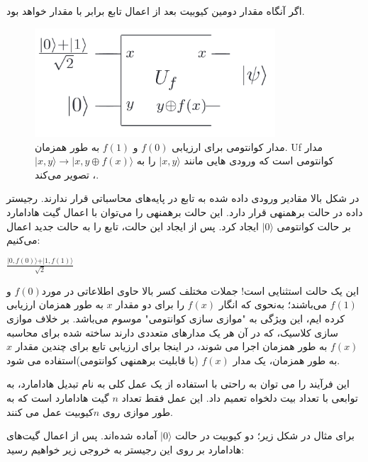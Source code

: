 \documentclass{book}
\begin{document}
اگر  آنگاه مقدار دومین کیوبیت بعد از اعمال تابع  برابر با مقدار  خواهد بود.

 \begin{center}
 	 \begin{figure}[ht]
 		\centering
 		\includegraphics[width=0.8\textwidth]{Uforacle.png}
 		\caption{مدار کوانتومی برای ارزیابی $f (0)$ و $f (1)$ به طور همزمان. Uf مدار کوانتومی است که ورودی هایی مانند $\vert x, y\rangle$ را به $\vert x, y \rangle \rightarrow \vert x, y \oplus f(x) \rangle$، تصویر می‌کند.}
 	\end{figure}
 \end{center}

در شکل بالا مقادیر ورودی داده شده به تابع  در پایه‌های محاسباتی قرار ندارند. رجیستر داده در حالت برهمنهی  قرار دارد. این حالت برهمنهی را می‌توان با اعمال گیت هادامارد بر حالت کوانتومی $\vert 0 \rangle$ ایجاد کرد. پس از ایجاد این حالت، تابع  را به حالت جدید اعمال می‌کنیم:
\begin{center}
	$\frac{\vert 0,f(0) \rangle +\vert 1,f(1) \rangle }{\sqrt{2}}$
\end{center}

این یک حالت استثنایی است! جملات مختلف کسر بالا حاوی اطلاعاتی در مورد$ f (0)$ و$f (1)$ می‌باشند؛ به‌نحوی که انگار $f (x)$ را برای دو مقدار $x$ به طور همزمان ارزیابی کرده ایم، این ویژگی به "موازی  سازی کوانتومی" موسوم می‌باشد. بر خلاف موازی سازی کلاسیک، که در آن هر یک مدارهای متعددی دارند ساخته شده برای محاسبه $f (x)$ به طور همزمان اجرا می شوند، در اینجا برای ارزیابی تابع برای چندین مقدار $x$ به طور همزمان، یک مدار $f (x)$ (با قابلیت برهمنهی کوانتومی)استفاده می شود.

این فرآیند را می توان به راحتی  با استفاده از یک عمل کلی به نام تبدیل هادامارد، به توابعی با تعداد بیت دلخواه تعمیم داد. این عمل فقط تعداد $n$ گیت هادامارد است که به طور موازی روی $n $کیوبیت عمل می کنند.

برای مثال در شکل زیر؛ دو کیوبیت در حالت $\vert 0 \rangle$ آماده شده‌‌اند. پس از اعمال گیت‌های هادامارد بر روی این رجیستر به خروجی زیر خواهیم رسید: 
\end{document}
